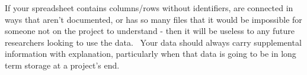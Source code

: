 \documentclass[
]{book}
\begin{document}
If your spreadsheet contains columns/rows without identifiers, are connected in ways that aren't documented, or has so many files that it would be impossible for someone not on the project to understand - then it will be useless to any future researchers looking to use the data.~ Your data should always carry supplemental information with explanation, particularly when that data is going to be in long term storage at a project's end.

\hfill\break

  
\end{document}
